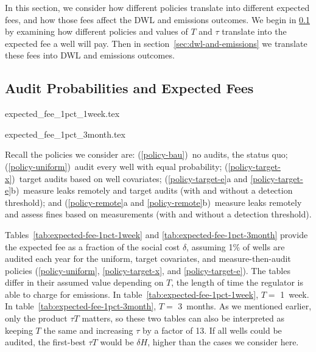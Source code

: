 \documentclass[12pt,oneside,letterpaper]{article}
\theoremstyle{definition}
\begin{document}
\begin{refsection}
In this section, we consider how different policies translate into different expected fees, and how those fees affect the \gls{DWL} and emissions outcomes.
We begin in \ref{sec:audit-probabilities-and-expected-fees} by examining how different policies and values of \(T\) and \(\tau\) translate into the expected fee a well will pay.
Then in section~\ref{sec:dwl-and-emissions} we translate these fees into \gls{DWL} and emissions outcomes.


\subsection{Audit Probabilities and Expected Fees}
\label{sec:audit-probabilities-and-expected-fees}

\begin{table}[!bthp]
{expected_fee_1pct_1week.tex} %
\end{table}
\begin{table}[!bthp]
{expected_fee_1pct_3month.tex} %
\end{table}

Recall the policies we consider are:
(\ref{policy-bau})~no audits, the status quo;
(\ref{policy-uniform})~audit every well with equal probability;
(\ref{policy-target-x})~target audits based on well covariates;
(\ref{policy-target-e}a and \ref{policy-target-e}b)~measure leaks remotely and target audits (with and without a detection threshold); and
(\ref{policy-remote}a and \ref{policy-remote}b)~measure leaks remotely and assess fines based on measurements (with and without a detection threshold).


Tables~\ref{tab:expected-fee-1pct-1week} and \ref{tab:expected-fee-1pct-3month}
provide the expected fee as a fraction of the social cost \(\delta\), assuming 1\% of wells are audited each year for the uniform, target covariates, and measure-then-audit policies (\ref{policy-uniform}, \ref{policy-target-x}, and \ref{policy-target-e}).
The tables differ in their assumed value depending on \(T\), the length of time the regulator is able to charge for emissions.
In table~\ref{tab:expected-fee-1pct-1week},  \(T = \) 1~week.
In table~\ref{tab:expected-fee-1pct-3month}, \(T = \) 3~months.
As we mentioned earlier, only the product \(\tau T\) matters, so these two tables can also be interpreted as keeping \(T\) the same and increasing \(\tau\) by a factor of 13.
If all wells could be audited, the first-best \(\tau T\) would be \(\delta H\), higher than the cases we consider here.



\end{refsection}
\end{document}
